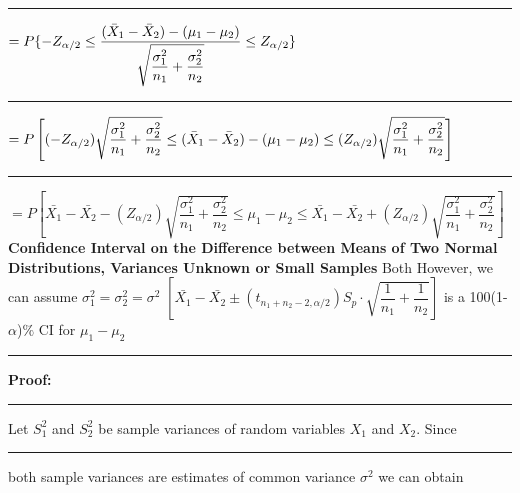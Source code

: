 \documentclass[]{article}
\begin{document}
\newline
\newline\Large\rule{4.3cm}{0pt} $ = P \{ -Z_{\alpha\\/2} \le    \dfrac{  (  \bar{X}_1 - \bar{X}_2 )  -  (\mu_1 - \mu_2)   }{\sqrt{\dfrac{\sigma^2_1}{n_1} + \dfrac{\sigma^2_2}{n_2} }}    \le Z_{\alpha\\/2}  \}$
\newline
\newline
\newline\Large\rule{3.3cm}{0pt} $ = P \left[  (-Z_{\alpha\\/2} ) \sqrt{\dfrac{\sigma^2_1}{n_1} + \dfrac{\sigma^2_2}{n_2} }  \le  (  \bar{X}_1 - \bar{X}_2 )  -  (\mu_1 - \mu_2)  \le (Z_{\alpha\\/2}) \sqrt{\dfrac{\sigma^2_1}{n_1} + \dfrac{\sigma^2_2}{n_2} }  \right]$
\newline\newline
\newline\Large\rule{2.3cm}{0pt} $ = P \left[   \bar{X_{1}} - \bar{X_{2}} - \left( Z_{\alpha / 2}  \right) \sqrt{\dfrac{\sigma^2_1}{n_1} + \dfrac{\sigma^2_2}{n_2}    }  \le  \mu_1 - \mu_2    \le   \bar{X_{1}} - \bar{X_{2}} + \left( Z_{\alpha / 2}  \right) \sqrt{\dfrac{\sigma^2_1}{n_1} + \dfrac{\sigma^2_2}{n_2}    }  \right]$
\newline
\newline
\newline
\newline
\Large\textbf{Confidence Interval on the Difference between Means of Two Normal Distributions, Variances Unknown or Small Samples}
\newline Both  However, we can assume $\sigma^2_1 = \sigma^2_2 =\sigma^2$
\newline
\newline
$\left[ \bar{X_{1}} - \bar{X_{2}} \pm \left( t_{n_{1}+ n_{2} -2 , \alpha / 2 }  \right) S_p \cdot  \sqrt{\dfrac{1}{n_1} + \dfrac{1}{n_2}    }      \right] $ is a 100(1-$\alpha$)$\%$ CI for $\mu_1 - \mu_2$ 
\newline 
\newline
\newline\Large\rule{3.0cm}{0pt} \textbf{Proof:}
\newline\Large\rule{3.0cm}{0pt} Let $S^2_1$ and $S^2_2$ be sample variances of random variables $X_1$ and $X_2$. Since 
\newline\Large\rule{3.0cm}{0pt} both sample variances are estimates of common variance $\sigma^2$ we can obtain
\end{document}
